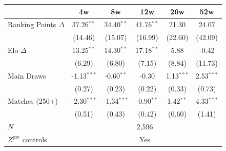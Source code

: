 \begin{tabular}{lccccc}
\toprule
 & 4w & 8w & 12w & 26w & 52w \\
\midrule
Ranking Points $\Delta$ & 37.26$^{**}$ & 34.40$^{**}$ & 41.76$^{**}$ & 21.30 & 24.07 \\
 & (14.46) & (15.07) & (16.99) & (22.60) & (42.09) \\[0.3em]
Elo $\Delta$ & 13.25$^{**}$ & 14.30$^{**}$ & 17.18$^{**}$ & 5.88 & -0.42 \\
 & (6.29) & (6.80) & (7.15) & (8.84) & (11.73) \\[0.3em]
Main Draws & -1.13$^{***}$ & -0.60$^{**}$ & -0.30 & 1.13$^{***}$ & 2.53$^{***}$ \\
 & (0.27) & (0.23) & (0.22) & (0.33) & (0.73) \\[0.3em]
Matches (250+) & -2.30$^{***}$ & -1.34$^{***}$ & -0.90$^{**}$ & 1.42$^{**}$ & 4.33$^{***}$ \\
 & (0.51) & (0.43) & (0.42) & (0.60) & (1.41) \\[0.3em]
\midrule
$N$ & \multicolumn{5}{c}{2,596} \\
$Z^{\text{pre}}$ controls & \multicolumn{5}{c}{Yes} \\
\bottomrule
\end{tabular}
